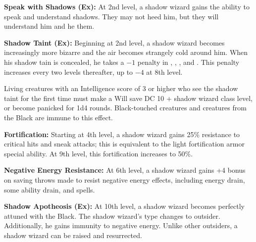{\textbf{Speak with Shadows (Ex):} At 2nd level, a shadow wizard gains the ability to speak and understand shadows. They may not heed him, but they will understand him and he them.

\textbf{Shadow Taint (Ex):} Beginning at 2nd level, a shadow wizard becomes increasingly more bizarre and the air becomes strangely cold around him. When his shadow tain is concealed, he takes a $-1$ penalty in , , , and . This penalty increases every two levels thereafter, up to $-4$ at 8th level.

Living creatures with an Intelligence score of 3 or higher who see the shadow taint for the first time must make a Will save DC 10 + shadow wizard class level, or become panicked for 1d4 rounds. Black-touched creatures and creatures from the Black are immune to this effect.

\textbf{Fortification:} Starting at 4th level, a shadow wizard gains 25\% resistance to critical hits and sneak attacks; this is equivalent to the light fortification armor special ability. At 9th level, this fortification increases to 50\%.

\textbf{Negative Energy Resistance:} At 6th level, a shadow wizard gains +4 bonus on saving throws made to resist negative energy effects, including energy drain, some ability drain, and  spells.

\textbf{Shadow Apotheosis (Ex):} At 10th level, a shadow wizard becomes perfectly attuned with the Black. The shadow wizard's type changes to outsider. Additionally, he gains immunity to negative energy. Unlike other outsiders, a shadow wizard can be raised and resurrected.

}
